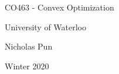 \documentclass[12pt]{article}
\begin{document}
\begin{titlepage}
  \centering
  \vspace*{2in}
  {\huge CO463 - Convex Optimization}\par
  \vspace{0.5in}
  {\large University of Waterloo}\par
  {\large Nicholas Pun}\par
  {\large Winter 2020}\par 
 \end{titlepage}
 
\tableofcontents
\clearpage


\end{document}
